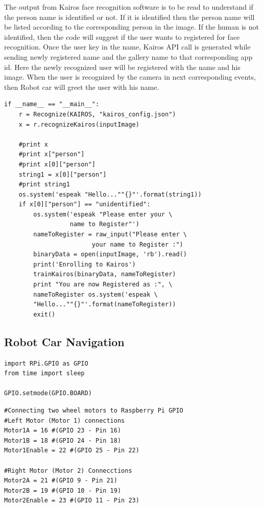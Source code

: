 \documentclass[sigconf]{acmart}
\begin{document}
The output from Kairos face recognition software is to be read to understand if the 
person name is identified or not. If it is identified then the person name will be 
listed according to the corresponding person in the image. If the human is not identified, 
then the code will suggest if the user wants to registered for face recognition. 
Once the user key in the name, Kairos API call is generated while sending newly 
registered name and the gallery name to that corresponding app id. Here the newly 
recognized user will be registered with the name and his image. When the user is 
recognized by the camera in next corresponding events, then Robot car will greet the 
user with his name.

\begin{verbatim}
if __name__ == "__main__":
    r = Recognize(KAIROS, "kairos_config.json")
    x = r.recognizeKairos(inputImage)
    
    #print x
    #print x["person"]
    #print x[0]["person"]
    string1 = x[0]["person"]
    #print string1
    os.system('espeak "Hello...""{}"'.format(string1))
    if x[0]["person"] == "unidentified":
        os.system('espeak "Please enter your \ 
                  name to Register"')
        nameToRegister = raw_input("Please enter \ 
                        your name to Register :")
        binaryData = open(inputImage, 'rb').read()
        print('Enrolling to Kairos')
        trainKairos(binaryData, nameToRegister)
        print "You are now Registered as :", \ 
        nameToRegister os.system('espeak \ 
        "Hello...""{}"'.format(nameToRegister))
        exit()
\end{verbatim}

\subsection{Robot Car Navigation}
\begin{verbatim}
import RPi.GPIO as GPIO
from time import sleep

GPIO.setmode(GPIO.BOARD)
\end{verbatim}

\begin{verbatim}
#Connecting two wheel motors to Raspberry Pi GPIO 
#Left Motor (Motor 1) connections
Motor1A = 16 #(GPIO 23 - Pin 16)
Motor1B = 18 #(GPIO 24 - Pin 18)
Motor1Enable = 22 #(GPIO 25 - Pin 22)

#Right Motor (Motor 2) Connecctions
Motor2A = 21 #(GPIO 9 - Pin 21)
Motor2B = 19 #(GPIO 10 - Pin 19)
Motor2Enable = 23 #(GPIO 11 - Pin 23)
\end{verbatim}
\end{document}
